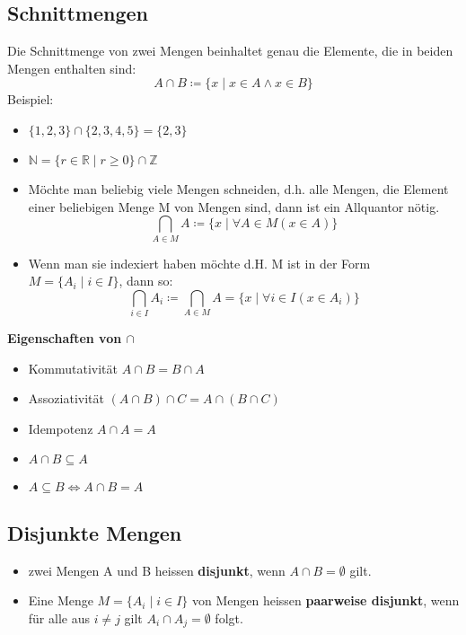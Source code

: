 \subsection{Schnittmengen}
 Die Schnittmenge von zwei Mengen beinhaltet genau die Elemente, die in beiden Mengen enthalten sind:
    \begin{equation}
        A \cap B \coloneqq \{x \mid x \in A \wedge x \in B\}
    \end{equation}
Beispiel:
\begin{itemize}
    \item $\{1,2,3\} \cap \{2,3,4,5\} = \{2,3\}$
    \item $\mathbb{N} = \{r \in \mathbb{R} \mid r \geq 0\} \cap \mathbb{Z}$
\end{itemize}
\begin{itemize}
    \item Möchte man beliebig viele Mengen schneiden, d.h. alle
    Mengen, die Element einer beliebigen Menge M von Mengen
    sind, dann ist ein Allquantor nötig.
    \begin{equation}
        \bigcap_{A \in M} A \coloneqq \{x \mid \forall{A} \in M(x \in A)\}
    \end{equation}
    \item Wenn man sie indexiert haben möchte d.H. M ist in der Form $M = \{A_i \mid i \in I\}$, dann so:
    \begin{equation}
        \bigcap_{i \in I} A_i \coloneqq \bigcap_{A \in M}A = \{x \mid \forall{i} \in I(x \in A_i)\}
    \end{equation}
\end{itemize}
{\bf Eigenschaften von $\cap$}
\begin{itemize}
    \item Kommutativität $A \cap B = B \cap A$
    \item Assoziativität $(A \cap B) \cap C = A \cap (B \cap C)$
    \item Idempotenz $A \cap A = A$
    \item $A \cap B \subseteq A$
    \item $A \subseteq B \Leftrightarrow A \cap B = A $
\end{itemize}
\subsection{Disjunkte Mengen}
\begin{itemize}
    \item zwei Mengen A und B heissen {\bf disjunkt}, wenn $A \cap B = \emptyset$ gilt.
    \item Eine Menge $M = \{A_i \mid i \in I\}$ von Mengen heissen {\bf paarweise disjunkt}, 
    wenn für alle aus $i \neq j$ gilt $A_i \cap A_j = \emptyset$ folgt.
\end{itemize}
